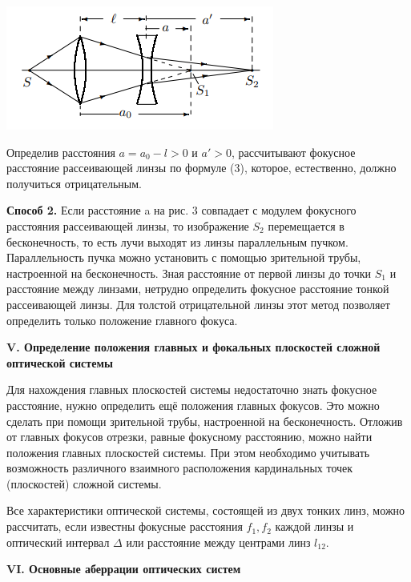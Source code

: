 \documentclass[a4paper,12pt]{report}
\begin{document}
\begin{center}
    \includegraphics[scale = 1]{pic3.PNG}
\end{center}
Определив расстояния $a = a_{0} - l > 0$ и $a' > 0$, рассчитывают фокусное расстояние рассеивающей линзы по формуле (3), которое, естественно, должно получиться отрицательным.

\vspace{\baselineskip}
\noindent\textbf{Способ 2.} Если расстояние a на рис. 3 совпадает с модулем фокусного
расстояния рассеивающей линзы, то изображение $S_{2}$ перемещается в
бесконечность, то есть лучи выходят из линзы параллельным пучком.
Параллельность пучка можно установить с помощью зрительной
трубы, настроенной на бесконечность. Зная расстояние от первой линзы
до точки $S_{1}$ и расстояние между линзами, нетрудно определить фокусное расстояние тонкой рассеивающей линзы. Для толстой отрицательной линзы этот метод позволяет определить только положение главного
фокуса.

\vspace{\baselineskip}
\noindent\textbf{V. Определение положения главных и фокальных плоскостей сложной
оптической системы}

Для нахождения главных плоскостей системы недостаточно знать
фокусное расстояние, нужно определить ещё положения главных фокусов. Это можно сделать при помощи зрительной трубы, настроенной на
бесконечность. Отложив от главных фокусов отрезки, равные фокусному расстоянию, можно найти положения главных плоскостей системы.
При этом необходимо учитывать возможность различного взаимного
расположения кардинальных точек (плоскостей) сложной системы.

Все характеристики оптической системы, состоящей из двух тонких
линз, можно рассчитать, если известны фокусные
расстояния $f_{1}, f_{2}$ каждой линзы и оптический интервал $\Delta$ или расстояние между центрами линз $l_{12}$.

\newpage
\vspace{\baselineskip}
\noindent\textbf{VI. Основные аберрации оптических систем}\\
\end{document}
